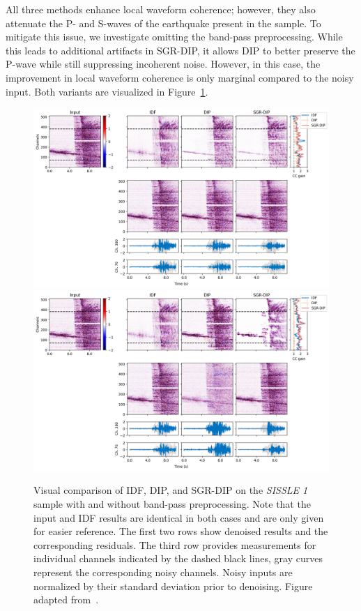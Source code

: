 All three methods enhance local waveform coherence; however, they also attenuate the P- and S-waves of the earthquake present in the sample.
To mitigate this issue, we investigate omitting the band-pass preprocessing.
While this leads to additional artifacts in SGR-DIP, it allows DIP to better preserve the P-wave while still suppressing incoherent noise.
However, in this case, the improvement in local waveform coherence is only marginal compared to the noisy input. 
Both variants are visualized in Figure~\ref{fig:SISSLE}.

\begin{figure}
    \centering
    \includegraphics[width=\textwidth]{img/fig_6.6_1.png}\\
    \vspace{10pt}
    \includegraphics[width=\textwidth]{img/fig_6.6_2.png}
    \caption{
        Visual comparison of IDF, DIP, and SGR-DIP on the \textit{SISSLE 1} sample with and without band-pass preprocessing.
        Note that the input and IDF results are identical in both cases and are only given for easier reference.
        The first two rows show denoised results and the corresponding residuals.
        The third row provides measurements for individual channels indicated by the dashed black lines, gray curves represent the corresponding noisy channels.
        Noisy inputs are normalized by their standard deviation prior to denoising.
        Figure adapted from~\cite{DAS-CN2S}.
    }\label{fig:SISSLE}
\end{figure}
